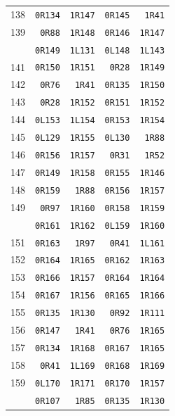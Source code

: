 \begin{longtable}{@{}r r r r r@{}}
138 & \texttt{0R134} & \texttt{1R147} & \texttt{0R145} & \texttt{1R41}\\
139 & \texttt{0R88} & \texttt{1R148} & \texttt{0R146} & \texttt{1R147}\\
\addlinespace[3pt]
140 & \texttt{0R149} & \texttt{1L131} & \texttt{0L148} & \texttt{1L143}\\
141 & \texttt{0R150} & \texttt{1R151} & \texttt{0R28} & \texttt{1R149}\\
142 & \texttt{0R76} & \texttt{1R41} & \texttt{0R135} & \texttt{1R150}\\
143 & \texttt{0R28} & \texttt{1R152} & \texttt{0R151} & \texttt{1R152}\\
144 & \texttt{0L153} & \texttt{1L154} & \texttt{0R153} & \texttt{1R154}\\
145 & \texttt{0L129} & \texttt{1R155} & \texttt{0L130} & \texttt{1R88}\\
146 & \texttt{0R156} & \texttt{1R157} & \texttt{0R31} & \texttt{1R52}\\
147 & \texttt{0R149} & \texttt{1R158} & \texttt{0R155} & \texttt{1R146}\\
148 & \texttt{0R159} & \texttt{1R88} & \texttt{0R156} & \texttt{1R157}\\
149 & \texttt{0R97} & \texttt{1R160} & \texttt{0R158} & \texttt{1R159}\\
\addlinespace[3pt]
150 & \texttt{0R161} & \texttt{1R162} & \texttt{0L159} & \texttt{1R160}\\
151 & \texttt{0R163} & \texttt{1R97} & \texttt{0R41} & \texttt{1L161}\\
152 & \texttt{0R164} & \texttt{1R165} & \texttt{0R162} & \texttt{1R163}\\
153 & \texttt{0R166} & \texttt{1R157} & \texttt{0R164} & \texttt{1R164}\\
154 & \texttt{0R167} & \texttt{1R156} & \texttt{0R165} & \texttt{1R166}\\
155 & \texttt{0R135} & \texttt{1R130} & \texttt{0R92} & \texttt{1R111}\\
156 & \texttt{0R147} & \texttt{1R41} & \texttt{0R76} & \texttt{1R165}\\
157 & \texttt{0R134} & \texttt{1R168} & \texttt{0R167} & \texttt{1R165}\\
158 & \texttt{0R41} & \texttt{1L169} & \texttt{0R168} & \texttt{1R169}\\
159 & \texttt{0L170} & \texttt{1R171} & \texttt{0R170} & \texttt{1R157}\\
\addlinespace[3pt]
160 & \texttt{0R107} & \texttt{1R85} & \texttt{0R135} & \texttt{1R130}\\

\end{longtable}
